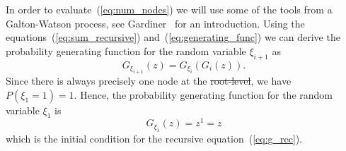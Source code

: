 \documentclass[10pt,letterpaper]{article}
\providecommand{\DIFaddtex}[1]{{\protect\color{blue}\uwave{#1}}} %
\providecommand{\DIFdeltex}[1]{{\protect\color{red}\sout{#1}}}                      %
\providecommand{\DIFaddbegin}{} %
\providecommand{\DIFaddend}{} %
\providecommand{\DIFdelbegin}{} %
\providecommand{\DIFdelend}{} %
\providecommand{\DIFadd}[1]{\texorpdfstring{\DIFaddtex{#1}}{#1}} %
\providecommand{\DIFdel}[1]{\texorpdfstring{\DIFdeltex{#1}}{}} %
\newcommand{\DIFscaledelfig}{0.5}
\newlength{\DIFdelgraphicswidth} %
\newlength{\DIFdelgraphicsheight} %
\newcommand{\DIFaddincludegraphics}[2][]{{\color{blue}\fbox{\DIFOincludegraphics[#1]{#2}}}} %
\newcommand{\DIFdelincludegraphics}[2][]{%
\sbox{\DIFdelgraphicsbox}{\DIFOincludegraphics[#1]{#2}}%
\settoboxwidth{\DIFdelgraphicswidth}{\DIFdelgraphicsbox} %
\settoboxtotalheight{\DIFdelgraphicsheight}{\DIFdelgraphicsbox} %
\scalebox{\DIFscaledelfig}{%
\parbox[b]{\DIFdelgraphicswidth}{\usebox{\DIFdelgraphicsbox}\\[-\baselineskip] \rule{\DIFdelgraphicswidth}{0em}}\llap{\resizebox{\DIFdelgraphicswidth}{\DIFdelgraphicsheight}{%
\setlength{\unitlength}{\DIFdelgraphicswidth}%
\begin{picture}(1,1)%
\thicklines\linethickness{2pt} %
{\color[rgb]{1,0,0}\put(0,0){\framebox(1,1){}}}%
{\color[rgb]{1,0,0}\put(0,0){\line( 1,1){1}}}%
{\color[rgb]{1,0,0}\put(0,1){\line(1,-1){1}}}%
\end{picture}%
}\hspace*{3pt}}} %
} %
\DeclareRobustCommand{\DIFaddbegin}{\DIFOaddbegin \let\includegraphics\DIFaddincludegraphics} %
\DeclareRobustCommand{\DIFaddend}{\DIFOaddend \let\includegraphics\DIFOincludegraphics} %
\DeclareRobustCommand{\DIFdelbegin}{\DIFOdelbegin \let\includegraphics\DIFdelincludegraphics} %
\DeclareRobustCommand{\DIFdelend}{\DIFOaddend \let\includegraphics\DIFOincludegraphics} %
\begin{document}
%

In order to evaluate~(\cref{eq:num_nodes}) we will use some of the tools from 
a Galton-Watson process, see Gardiner~\cite{gardiner1985stochastic} for 
an introduction.
Using the equations~(\cref{eq:sum_recursive}) and~(\cref{eq:generating_func}) we can 
derive the probability generating function for the random variable $\xi_{i+1}$ as 
\begin{equation}\label{eq:g_rec}
G_{\xi_{i+1}}(z) = G_{\xi_i}(G_i(z)).
\end{equation}
Since there is always precisely one node at the \DIFdelbegin \DIFdel{root-level}\DIFdelend \DIFaddbegin \DIFadd{root level}\DIFaddend , we have $P(\xi_1 = 1) = 1.$ 
Hence, the probability generating function for the random variable $\xi_1$ is 
\begin{equation}\label{eq:g_xi_one}
G_{\xi_1}(z) = z^1 = z
\end{equation}
which is the initial condition for the recursive equation~(\cref{eq:g_rec}).
\end{document}
